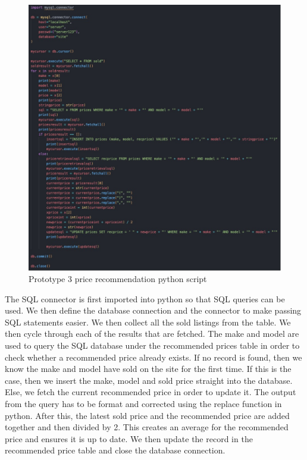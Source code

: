 \begin{figure}[H]
    \centering
    \includegraphics[scale=0.4]{ch3_developing/proto3/pricepython.jpg}
    \caption{Prototype 3 price recommendation python script}
    \label{fig:proto3_pricepython}
\end{figure}
The SQL connector is first imported into python so that SQL queries can be used. We then define the database connection and the connector to make passing SQL statements easier. We then collect all the sold listings from the table. We then cycle through each of the results that are fetched. The make and model are used to query the SQL database under the recommended prices table in order to check whether a recommended price already exists. If no record is found, then we know the make and model have sold on the site for the first time. If this is the case, then we insert the make, model and sold price straight into the database. Else, we fetch the current recommended price in order to update it. The output from the query has to be format and corrected using the replace function in python. After this, the latest sold price and the recommended price are added together and then divided by 2. This creates an average for the recommended price and ensures it is up to date. We then update the record in the recommended price table and close the database connection. 
